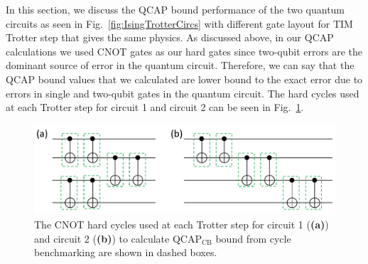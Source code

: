 In this section, we discuss the QCAP bound performance of the two quantum circuits as seen in Fig.~\ref{fig:IsingTrotterCircs} with different gate layout for TIM Trotter step that gives the same physics. As discussed above, in our QCAP calculations we used CNOT gates as our hard gates since two-qubit errors are the dominant source of error in the quantum circuit. Therefore, we can say that the QCAP bound values that we calculated are lower bound to the exact error due to errors in single and two-qubit gates in the quantum circuit. The hard cycles used at each Trotter step for circuit 1 and circuit 2 can be seen in Fig.~\ref{fig:hardcycles}.  
\begin{figure}[ht!]
    \includegraphics[scale=0.50]{hardcyclesCirc1Circ2.pdf}
    \caption{The CNOT hard cycles used at each Trotter step for circuit 1 ({\bf{(a)}}) and circuit 2 ({\bf{(b)}}) to calculate QCAP$_{\text{CB}}$ bound from cycle benchmarking are shown in dashed boxes.}
    \label{fig:hardcycles}
\end{figure}



